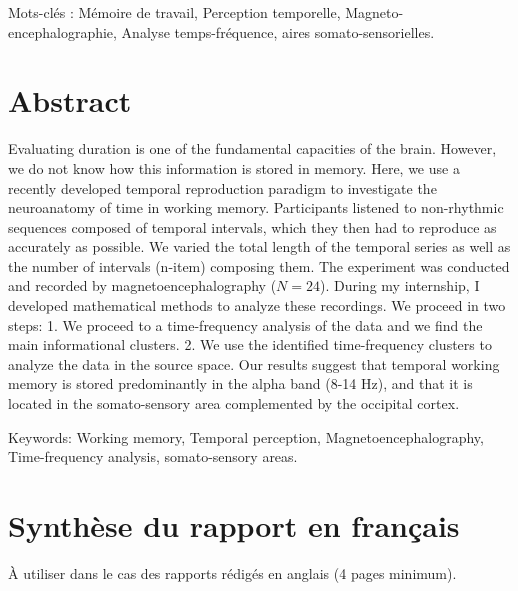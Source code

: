 Mots-clés :
Mémoire de travail, Perception temporelle, Magneto-encephalographie, Analyse temps-fréquence, aires somato-sensorielles.

\chapter*{\centering Abstract}

Evaluating duration is one of the fundamental capacities of the brain. However, we do not know how this information is stored in memory. Here, we use a recently developed temporal reproduction paradigm to investigate the neuroanatomy of time in working memory. Participants listened to non-rhythmic sequences composed of temporal intervals, which they then had to reproduce as accurately as possible. We varied the total length of the temporal series as well as the number of intervals (n-item) composing them. The experiment was conducted and recorded by magnetoencephalography ($N=24$). During my internship, I developed mathematical methods to analyze these recordings. We proceed in two steps: 1. We proceed to a time-frequency analysis of the data and we find the main informational clusters. 2. We use the identified time-frequency clusters to analyze the data in the source space. Our results suggest that temporal working memory is stored predominantly in the alpha band (8-14 Hz), and that it is located in the somato-sensory area complemented by the occipital cortex.

Keywords:
Working memory, Temporal perception, Magnetoencephalography, Time-frequency analysis, somato-sensory areas.

\chapter*{\centering Synthèse du rapport en français}

À utiliser dans le cas des rapports rédigés en anglais (4 pages minimum).
